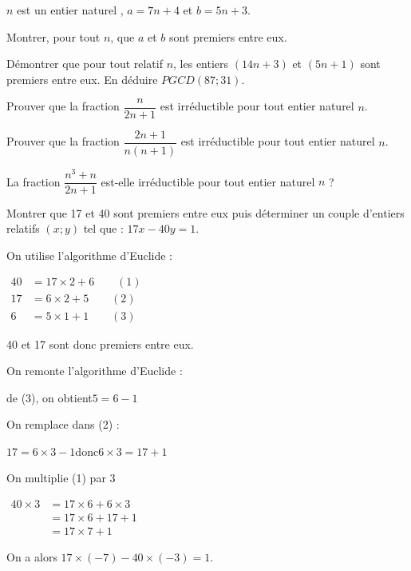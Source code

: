 \documentclass{cornouaille}
\begin{document}
\begin{exercice}
$n$ est un entier naturel , $a=7n+4$ et $b=5n+3$.

Montrer, pour tout $n$, que $a$ et $b$ sont premiers entre eux.
\end{exercice}

\begin{exercice}
Démontrer que pour tout relatif $n$, les entiers $(14n+3)$ et $(5n+1)$ sont premiers entre eux. En déduire $PGCD(87;31)$.
\end{exercice}

\begin{exercice}
Prouver que la fraction $\dfrac{n}{2n+1}$ est irréductible pour tout entier naturel $n$.
\end{exercice}

\begin{exercice}
Prouver que la fraction $\dfrac{2n+1}{n(n+1)}$ est irréductible pour tout entier naturel $n$.
\end{exercice}

\begin{exercice}
La fraction $\dfrac{n^3+n}{2n+1}$ est-elle irréductible pour tout entier naturel $n$ ?
\end{exercice}

\begin{exercice}[]
\label{exo-sol_particuliere}
Montrer que 17 et 40 sont premiers entre eux puis déterminer un couple d'entiers relatifs $(x;y)$ tel que : $17x-40y= 1$.
\end{exercice}
\begin{solution}
  On utilise l'algorithme d'Euclide :

$\begin{aligned}
40&=17\times2+6\qquad (1)\\
17&=6\times2+5\qquad (2)\\
6&=5\times1+1\qquad (3)\end{aligned}$\medskip

40 et 17 sont donc premiers entre eux.\medskip

On remonte l'algorithme d'Euclide :

de (3), on obtient\enskip $5=6-1$\medskip

On remplace dans (2) :

$17=6\times3-1$\enskip donc\enskip $6\times3=17+1$\medskip

On multiplie (1) par 3

$\begin{aligned}
40\times3&=17\times6+6\times3\\
				 &=17\times6+17+1\\
				 &=17\times7+1\end{aligned}$\medskip
				
On a alors \enskip $17\times(-7)-40\times(-3)=1$.
\end{solution}
\end{document}
